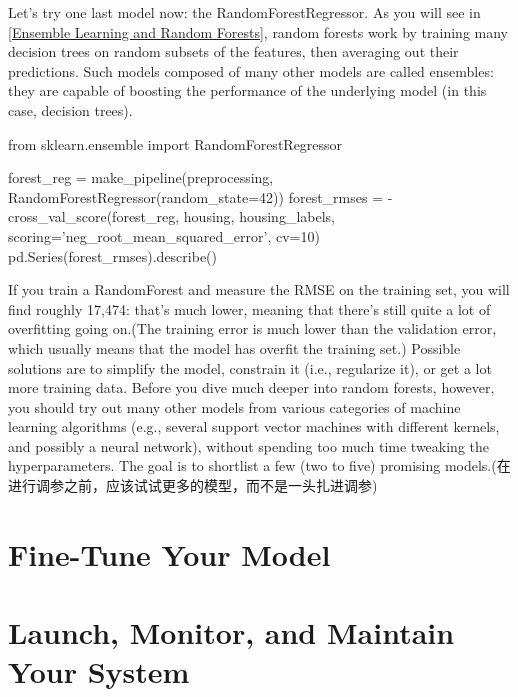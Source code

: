 Let’s try one last model now: the RandomForestRegressor. As you will see in \autoref{Ensemble Learning and Random Forests}, random forests work by training many decision trees on random subsets of the features, then averaging out their predictions. Such models composed of many other models are called ensembles: they are capable of boosting the performance of the underlying model (in this case, decision trees). 

\begin{pyc}
from sklearn.ensemble import RandomForestRegressor

forest_reg = make_pipeline(preprocessing,
                           RandomForestRegressor(random_state=42))
forest_rmses = - cross_val_score(forest_reg, 
                                 housing, 
                                 housing_labels,
                                 scoring='neg_root_mean_squared_error',
                                 cv=10)
pd.Series(forest_rmses).describe()
\end{pyc}
If you train a RandomForest and measure the RMSE on the training set, you will find roughly 17,474: that’s much lower, meaning that there’s still quite a lot of overfitting going on.(The training error is much lower than the validation error, which usually means that the model has overfit the training set.) Possible solutions are to simplify the model, constrain
it (i.e., regularize it), or get a lot more training data. Before you dive much deeper
into random forests, however, you should try out many other models from various
categories of machine learning algorithms (e.g., several support vector machines with
different kernels, and possibly a neural network), without spending too much time
tweaking the hyperparameters. The goal is to shortlist a few (two to five) promising
models.(在进行调参之前，应该试试更多的模型，而不是一头扎进调参)

\section{Fine-Tune Your Model}

\section{Launch, Monitor, and Maintain Your System}

